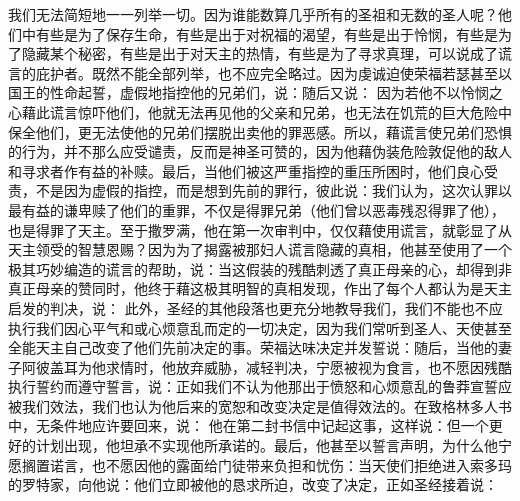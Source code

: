 我们无法简短地一一列举一切。因为谁能数算几乎所有的圣祖和无数的圣人呢？他们中有些是为了保存生命，有些是出于对祝福的渴望，有些是出于怜悯，有些是为了隐藏某个秘密，有些是出于对天主的热情，有些是为了寻求真理，可以说成了谎言的庇护者。既然不能全部列举，也不应完全略过。因为虔诚迫使荣福若瑟甚至以国王的性命起誓，虚假地指控他的兄弟们，说：随后又说：  因为若他不以怜悯之心藉此谎言惊吓他们，他就无法再见他的父亲和兄弟，也无法在饥荒的巨大危险中保全他们，更无法使他的兄弟们摆脱出卖他的罪恶感。所以，藉谎言使兄弟们恐惧的行为，并不那么应受谴责，反而是神圣可赞的，因为他藉伪装危险敦促他的敌人和寻求者作有益的补赎。最后，当他们被这严重指控的重压所困时，他们良心受责，不是因为虚假的指控，而是想到先前的罪行，彼此说：我们认为，这次认罪以最有益的谦卑赎了他们的重罪，不仅是得罪兄弟（他们曾以恶毒残忍得罪了他），也是得罪了天主。至于撒罗满，他在第一次审判中，仅仅藉使用谎言，就彰显了从天主领受的智慧恩赐？因为为了揭露被那妇人谎言隐藏的真相，他甚至使用了一个极其巧妙编造的谎言的帮助，说：当这假装的残酷刺透了真正母亲的心，却得到非真正母亲的赞同时，他终于藉这极其明智的真相发现，作出了每个人都认为是天主启发的判决，说：  此外，圣经的其他段落也更充分地教导我们，我们不能也不应执行我们因心平气和或心烦意乱而定的一切决定，因为我们常听到圣人、天使甚至全能天主自己改变了他们先前决定的事。荣福达味决定并发誓说：随后，当他的妻子阿彼盖耳为他求情时，他放弃威胁，减轻判决，宁愿被视为食言，也不愿因残酷执行誓约而遵守誓言，说：正如我们不认为他那出于愤怒和心烦意乱的鲁莽宣誓应被我们效法，我们也认为他后来的宽恕和改变决定是值得效法的。在致格林多人书中，无条件地应许要回来，说：  他在第二封书信中记起这事，这样说：但一个更好的计划出现，他坦承不实现他所承诺的。最后，他甚至以誓言声明，为什么他宁愿搁置诺言，也不愿因他的露面给门徒带来负担和忧伤：当天使们拒绝进入索多玛的罗特家，向他说：他们立即被他的恳求所迫，改变了决定，正如圣经接着说：  